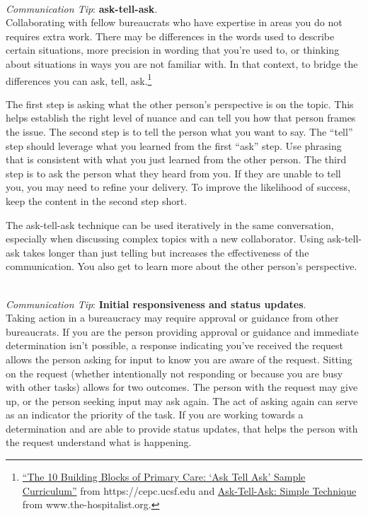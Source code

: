 \ \\
\textit{Communication Tip}: \textbf{ask-tell-ask}.\\
Collaborating with fellow bureaucrats who have expertise in areas you do not requires extra work. There may be differences in the words used to describe certain situations, more precision in wording that you're used to, or thinking about situations in ways you are not familiar with. In that context, to bridge the differences you can ask, tell, ask.\footnote{\href{https://cepc.ucsf.edu/sites/cepc.ucsf.edu/files/Curriculum_sample_14-0602.pdf}{``The 10 Building Blocks of Primary Care: `Ask Tell Ask' Sample Curriculum''} from https://cepc.ucsf.edu and \href{https://www.the-hospitalist.org/hospitalist/article/125126/qi-initiatives/ask-tell-ask-simple-technique-can-help-hospitalists}{Ask-Tell-Ask: Simple Technique} from www.the-hospitalist.org.} 

The first step is asking what the other person's perspective is on the topic. This helps establish the right level of nuance and can tell you how that person frames the issue. The second step is to tell the person what you want to say. The ``tell'' step should leverage what you learned from the first ``ask'' step. Use phrasing that is consistent with what you just learned from the other person. The third step is to ask the person what they heard from you. If they are unable to tell you, you may need to refine your delivery. To improve the likelihood of success, keep the content in the second step short. 

The ask-tell-ask technique can be used iteratively in the same conversation, especially when discussing complex topics with a new collaborator. 
Using ask-tell-ask takes longer than just telling but increases the effectiveness of the communication. You also get to learn more about the other person's perspective. 

\ \\
\textit{Communication Tip}: \textbf{Initial responsiveness and status updates}.\\
Taking action in a bureaucracy may require approval or guidance from other bureaucrats. If you are the person providing approval or guidance and immediate determination isn't possible, a response indicating you've received the request allows the person asking for input to know you are aware of the request. Sitting on the request (whether intentionally not responding or because you are busy with other tasks) allows for two outcomes. The person with the request may give up, or the person seeking input may ask again. The act of asking again can serve as an indicator the priority of the task. If you are working towards a determination and are able to provide status updates, that helps the person with the request understand what is happening.



